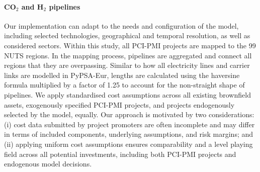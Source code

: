 \documentclass[pdflatex,sn-nature]{sn-jnl}
\theoremstyle{thmstyleone}%
\theoremstyle{thmstyletwo}%
\theoremstyle{thmstylethree}%
\begin{document}
\begin{appendices}
\paragraph{CO$_2$ and H$_2$ pipelines}
Our implementation can adapt to the needs and configuration of the model, including selected technologies, geographical and temporal resolution, as well as considered sectors. Within this study, all PCI-PMI projects are mapped to the 99 NUTS regions. In the mapping process, pipelines are aggregated and connect all regions that they are overpassing. Similar to how all electricity lines and carrier links are modelled in PyPSA-Eur, lengths are calculated using the haversine formula multiplied by a factor of 1.25 to account for the non-straight shape of pipelines.
We apply standardised cost assumptions \cite{zeyenPyPSATechnologydataV01012025} across all existing brownfield assets, exogenously specified PCI-PMI projects, and projects endogenously selected by the model, equally. Our approach is motivated by two considerations: (i) cost data submitted by project promoters are often incomplete and may differ in terms of included components, underlying assumptions, and risk margins; and (ii) applying uniform cost assumptions ensures comparability and a level playing field across all potential investments, including both PCI-PMI projects and endogenous model decisions.


\end{appendices}
\end{document}
